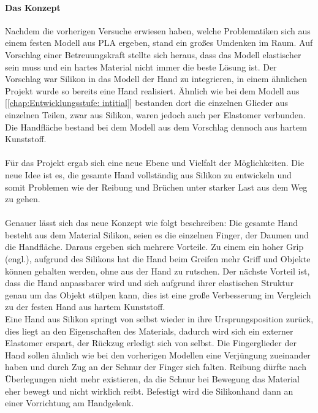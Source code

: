 \documentclass[titlepage,12pt,twoside]{article}
\begin{document}
\paragraph{Das Konzept}
\hfill \break
\hfill \break
Nachdem die vorherigen Versuche erwiesen haben, welche Problematiken sich aus einem festen Modell aus PLA ergeben, stand ein großes Umdenken im Raum. Auf Vorschlag einer Betreuungskraft stellte sich heraus, dass das Modell elastischer sein muss und 
ein hartes Material nicht immer die beste Lösung ist. Der Vorschlag war Silikon in das Modell der Hand zu integrieren, in einem ähnlichen Projekt wurde so bereits eine Hand realisiert. Ähnlich wie bei dem Modell aus [\textcolor{blue}{\autoref{chap:Entwicklungsstufe: intitial}}] bestanden 
dort die einzelnen Glieder aus einzelnen Teilen, zwar aus Silikon, waren jedoch auch per Elastomer verbunden. Die Handfläche bestand bei dem Modell aus dem Vorschlag dennoch aus hartem Kunststoff. \\
\\
Für das Projekt  ergab sich eine neue Ebene und Vielfalt der Möglichkeiten. Die neue Idee ist es, die gesamte Hand vollständig aus Silikon zu entwickeln und somit Problemen wie der Reibung und Brüchen unter starker Last aus dem 
Weg zu gehen. \\
\\
Genauer lässt sich das neue Konzept wie folgt beschreiben: Die gesamte Hand besteht aus dem Material Silikon, seien es die einzelnen Finger, der Daumen und die Handfläche. Daraus ergeben sich mehrere Vorteile. Zu einem ein hoher Grip (engl.), aufgrund des 
Silikons hat die Hand beim Greifen mehr Griff und Objekte können gehalten werden, ohne aus der Hand zu rutschen. Der nächste Vorteil ist, dass die Hand anpassbarer wird und sich aufgrund ihrer elastischen Struktur genau um das Objekt stülpen kann, 
dies ist eine große Verbesserung im Vergleich zu der festen Hand aus hartem Kunststoff. \\
Eine Hand aus Silikon springt von selbst wieder in ihre Ursprungsposition zurück, dies liegt an den Eigenschaften des Materials, dadurch wird sich ein externer Elastomer erspart, der Rückzug erledigt sich von selbst. Die Fingerglieder der Hand sollen 
ähnlich wie bei den vorherigen Modellen eine Verjüngung zueinander haben und durch Zug an der Schnur der Finger sich falten. Reibung dürfte nach Überlegungen nicht mehr existieren, da die Schnur bei Bewegung das Material eher bewegt und nicht wirklich 
reibt. Befestigt wird die Silikonhand dann an einer Vorrichtung am Handgelenk. \\
\\
\newpage
\end{document}

